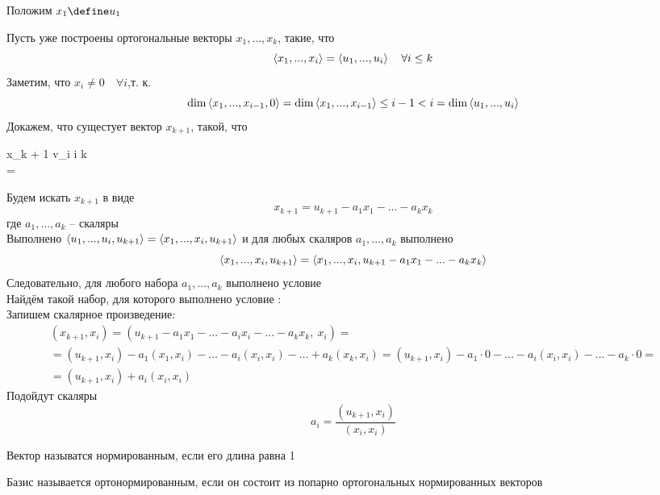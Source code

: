 \begin{iproof}
	\item Положим $ x_1 \define u_1 $
	\item Пусть уже построены ортогональные векторы $ x_1, ..., x_k $, такие, что
	$$ \braket{x_1, ..., x_i} = \braket{u_1, ..., u_i} \quad \forall i \le k $$
	Заметим, что $ x_i \ne 0 \quad \forall i $,т. к.
	$$ \dim\braket{x_1, ..., x_{i - 1}, 0} = \dim\braket{x_1, ..., x_{i - 1}} \le i - 1 < i = \dim\braket{u_1, ..., u_i} $$
	Докажем, что сущестует вектор $ x_{k + 1} $, такой, что
	\begin{mequ}
		 x_{k + 1} \perp v_i \quad \forall i \le k \\
		  = 
	\end{mequ}
	Будем искать $ x_{k + 1} $ в виде
	$$ x_{k + 1} = u_{k + 1} - a_1x_1 - ... - a_kx_k $$
	где $ a_1, ..., a_k $ -- скаляры \\
	Выполнено $ \braket{u_1, ..., u_i, u_{k + 1}} = \braket{x_1, ..., x_i, u_{k + 1}} $ и для любых скаляров $ a_1, ..., a_k $ выполнено
	$$ \braket{x_1, ..., x_i, u_{k + 1}} = \braket{x_1, ..., x_i, u_{k + 1} - a_1x_1 - ... - a_kx_k} $$
	Следовательно, для любого набора $ a_1, ..., a_k $ выполнено условие  \\
	Найдём такой набор, для которого выполнено условие : \\
	Запишем скалярное произведение:
	\begin{multline*}
		(x_{k + 1}, x_i) = (u_{k + 1} - a_1x_1 - ... - a_ix_i - ... - a_kx_k, ~ x_i) = \\
		= (u_{k + 1}, x_i) - a_1(x_1, x_i) - ... - a_i(x_i, x_i) - ... + a_k(x_k, x_i) = (u_{k + 1}, x_i) - a_1 \cdot 0 - ... - a_i(x_i, x_i) - ... - a_k \cdot 0 = \\
		= (u_{k + 1}, x_i) + a_i(x_i, x_i)
	\end{multline*}
	Подойдут скаляры
	$$ a_i = \frac{(u_{k + 1}, x_i)}{(x_i, x_i)} $$
\end{iproof}

\begin{definition}
	Вектор называтся нормированным, если его длина равна 1
\end{definition}

\begin{definition}
	Базис называется ортонормированным, если он состоит из попарно ортогональных нормированных векторов
\end{definition}

